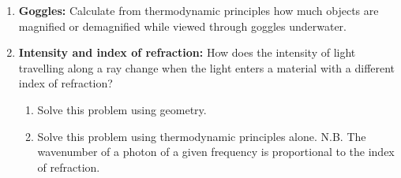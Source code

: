 \begin{enumerate}
\item {\bf Goggles:}
Calculate from thermodynamic principles how much objects are magnified
or demagnified while viewed through goggles underwater.

\item {\bf Intensity and index of refraction: }
How does the intensity of light travelling along a ray change when the
light enters a material with a different index of refraction?
\begin{enumerate}
\item Solve this problem using geometry.
\item Solve this problem using thermodynamic principles alone.
N.B. The wavenumber of a photon of a given frequency is proportional
to the index of refraction.
\end{enumerate}
\end{enumerate}

 	
